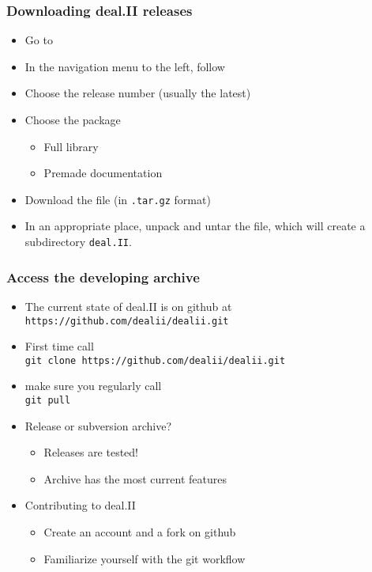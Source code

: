 \begin{frame}
  \frametitle{Downloading deal.II releases}
  \begin{itemize}
  \item Go to \texttt{}
  \item In the navigation menu to the left, follow
  \item Choose the release number (usually the latest)
  \item Choose the package
    \begin{itemize}
    \item Full library
    \item Premade documentation
    \end{itemize}
  \item Download the file (in \texttt{.tar.gz} format)
  \item In an appropriate place, unpack and untar the file, which will
    create a subdirectory \texttt{deal.II}.
  \end{itemize}
\end{frame}

\begin{frame}
  \frametitle{Access the developing archive}
  \begin{itemize}
  \item The current state of deal.II is on github at\\
    \texttt{https://github.com/dealii/dealii.git}
  \item First time call\\
    \texttt{\footnotesize git clone https://github.com/dealii/dealii.git}
  \item make sure you regularly call\\
    \texttt{git pull}
  \item Release or subversion archive?
    \begin{itemize}
    \item Releases are tested!
    \item Archive has the most current features
    \end{itemize}
    \pause
    \item Contributing to deal.II
      \begin{itemize}
      \item Create an account and a fork on github
      \item Familiarize yourself with the git workflow
      \end{itemize}
  \end{itemize}
\end{frame}

